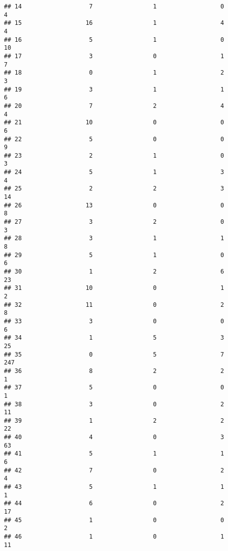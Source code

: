 \documentclass[
]{article}
\begin{document}
\begin{verbatim}
## 14                   7                 1                  0                4
## 15                  16                 1                  4                4
## 16                   5                 1                  0               10
## 17                   3                 0                  1                7
## 18                   0                 1                  2                3
## 19                   3                 1                  1                6
## 20                   7                 2                  4                4
## 21                  10                 0                  0                6
## 22                   5                 0                  0                9
## 23                   2                 1                  0                3
## 24                   5                 1                  3                4
## 25                   2                 2                  3               14
## 26                  13                 0                  0                8
## 27                   3                 2                  0                3
## 28                   3                 1                  1                8
## 29                   5                 1                  0                6
## 30                   1                 2                  6               23
## 31                  10                 0                  1                2
## 32                  11                 0                  2                8
## 33                   3                 0                  0                6
## 34                   1                 5                  3               25
## 35                   0                 5                  7              247
## 36                   8                 2                  2                1
## 37                   5                 0                  0                1
## 38                   3                 0                  2               11
## 39                   1                 2                  2               22
## 40                   4                 0                  3               63
## 41                   5                 1                  1                6
## 42                   7                 0                  2                4
## 43                   5                 1                  1                1
## 44                   6                 0                  2               17
## 45                   1                 0                  0                2
## 46                   1                 0                  1               11

\end{verbatim}
\end{document}
